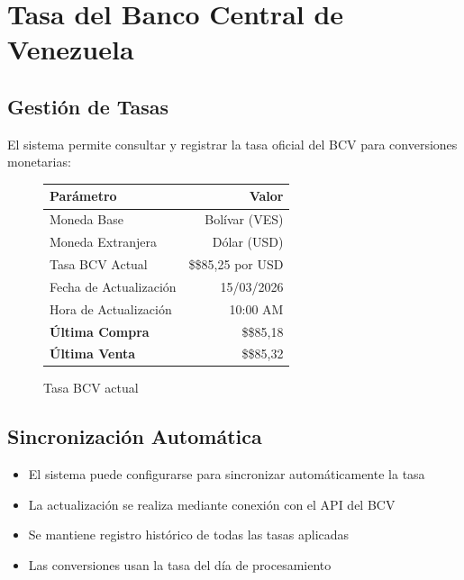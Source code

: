 \section{Tasa del Banco Central de Venezuela}

\subsection*{Gestión de Tasas}

El sistema permite consultar y registrar la tasa oficial del BCV para conversiones monetarias:

\begin{figure}[H]
\centering
\begin{tcolorbox}[
    enhanced,
    colback=white,
    colframe=sandraDark,
    width=0.85\textwidth,
    halign=center
]
\begin{tabular}{lr}
\toprule
\textbf{Parámetro} & \textbf{Valor} \\
\midrule
Moneda Base & Bolívar (VES) \\
Moneda Extranjera & Dólar (USD) \\
Tasa BCV Actual & \$\$85,25 por USD \\
Fecha de Actualización & 15/03/2026 \\
Hora de Actualización & 10:00 AM \\
\midrule
\textbf{Última Compra} & \$\$85,18 \\
\textbf{Última Venta} & \$\$85,32 \\
\bottomrule
\end{tabular}
\end{tcolorbox}
\caption{Tasa BCV actual}
\label{fig:tasa-bcv}
\end{figure}

\subsection*{Sincronización Automática}

\begin{itemize}[leftmargin=*]
    \item El sistema puede configurarse para sincronizar automáticamente la tasa
    \item La actualización se realiza mediante conexión con el API del BCV
    \item Se mantiene registro histórico de todas las tasas aplicadas
    \item Las conversiones usan la tasa del día de procesamiento
\end{itemize}

